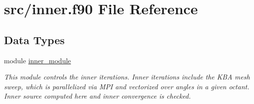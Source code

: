 \hypertarget{inner_8f90}{\section{src/inner.f90 File Reference}
\label{inner_8f90}
}
\subsection*{Data Types}
\begin{DoxyCompactItemize}
\item 
module \hyperlink{classinner__module}{inner\-\_\-module}
\begin{DoxyCompactList}\small\item\em This module controls the inner iterations. Inner iterations include the K\-B\-A mesh sweep, which is parallelized via M\-P\-I and vectorized over angles in a given octant. Inner source computed here and inner convergence is checked. \end{DoxyCompactList}\end{DoxyCompactItemize}
